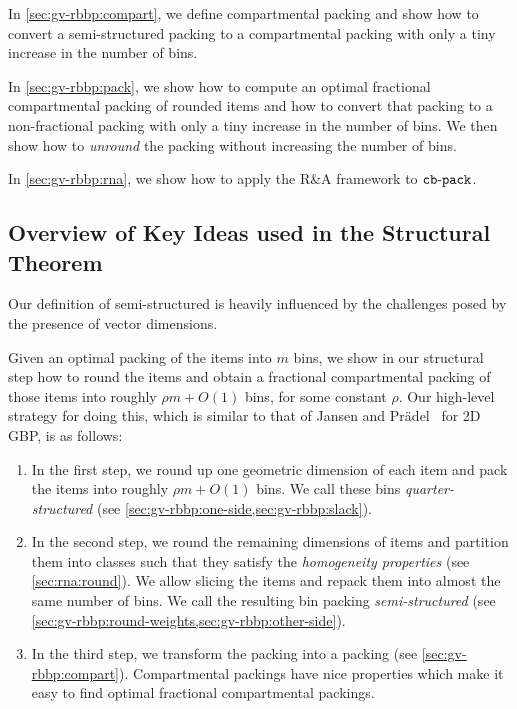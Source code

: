 In \cref{sec:gv-rbbp:compart}, we define compartmental packing and
show how to convert a semi-structured packing to a compartmental packing
with only a tiny increase in the number of bins.

In \cref{sec:gv-rbbp:pack}, we show how to compute an optimal fractional
compartmental packing of rounded items and how to convert that packing to a
non-fractional packing with only a tiny increase in the number of bins.
We then show how to \emph{unround} the packing without increasing the number of bins.

In \cref{sec:gv-rbbp:rna}, we show how to apply the R\&A framework to $\operatorname{\mathtt{cb-pack}}$.

\subsection{Overview of Key Ideas used in the Structural Theorem}

Our definition of semi-structured is heavily influenced by the challenges
posed by the presence of vector dimensions.

Given an optimal packing of the items into $m$ bins, we show in our structural step
how to round the items and obtain a fractional compartmental packing
of those items into roughly $\rho m + O(1)$ bins, for some constant $\rho$.
Our high-level strategy for doing this, which is similar to that of
Jansen and Pr\"adel~\cite{jansen2016new,pradel-thesis} for 2D GBP, is as follows:
\begin{enumerate}
\item In the first step,
    we round up one geometric dimension of each item and pack the items into
    roughly $\rho m + O(1)$ bins. We call these bins \emph{quarter-structured}
    (see \cref{sec:gv-rbbp:one-side,sec:gv-rbbp:slack}).
\item In the second step,
    we round the remaining dimensions of items and partition them into classes such that
    they satisfy the \emph{homogeneity properties} (see \cref{sec:rna:round}).
    We allow slicing the items and repack them into almost the same number of bins.
    We call the resulting bin packing \emph{semi-structured}
    (see \cref{sec:gv-rbbp:round-weights,sec:gv-rbbp:other-side}).
\item In the third step,
    we transform the packing into a \emph{\compartmentalHyp} packing
    (see \cref{sec:gv-rbbp:compart}).
    Compartmental packings have nice properties which make it easy to find
    optimal fractional compartmental packings.
\end{enumerate}


